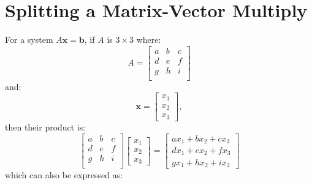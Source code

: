 \documentclass[ltr]{ornltm} %
\numberwithin{equation}{section}
\begin{document}
	\appendix
	\acresetall %


	\section{Splitting a Matrix-Vector Multiply} \label{sec:matrix-vector-multiply}
	For a system $A\mathbf{x}=\mathbf{b}$, if $A$ is $3\times 3$ where:
	\begin{equation}
		\label{eq:a-matrix}
		A = \begin{bmatrix}
				a & b & c \\
				d & e & f \\
				g & h & i \\
		\end{bmatrix}
	\end{equation}
	and:
	\begin{equation}
		\label{eq:x_vec}
		\mathbf{x} =
		\begin{bmatrix}
			x_1 \\
			x_2 \\
			x_3
		\end{bmatrix},
	\end{equation}
	then their product is:
	\begin{equation}
		\label{eq:ax-product}
		\begin{bmatrix}
			a & b & c \\
			d & e & f \\
			g & h & i \\
		\end{bmatrix}
		\begin{bmatrix}
			x_1 \\
			x_2 \\
			x_3
		\end{bmatrix}=
		\begin{bmatrix}
			ax_1+bx_2+cx_3 \\
			dx_1+ex_2+fx_3 \\
			gx_1+hx_2+ix_3
		\end{bmatrix}
	\end{equation}
	which can also be expressed as:
\end{document}
